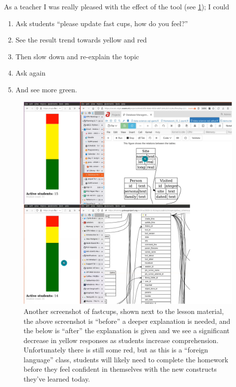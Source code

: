 \documentclass[paper=a4,justified,a4paper]{tufte-handout}
\providecommand{\tightlist}{%
  \setlength{\itemsep}{0pt}\setlength{\parskip}{0pt}}
\begin{document}
As a teacher I was really pleased with the effect of the tool (see
\cref{fig3}); I could

\begin{enumerate}
\def\labelenumi{\arabic{enumi}.}
\tightlist
\item
  Ask students ``please update fast cups, how do you feel?''
\item
  See the result trend towards yellow and red
\item
  Then slow down and re-explain the topic
\item
  Ask again
\item
  And see more green.
\end{enumerate}

\begin{figure}
\centering
\includegraphics{pre.png}
\caption{Another screenshot of fastcups, shown next to the lesson
material, the above screenshot is ``before'' a deeper explanation is
needed, and the below is ``after'' the explanation is given and we see a
significant decrease in yellow responses as students increase
comprehension. Unfortunately there is still some red, but as this is a
``foreign language'' class, students will likely need to complete the
homework before they feel confident in themselves with the new
constructs they've learned today.\label{fig3}}
\end{figure}
\end{document}
